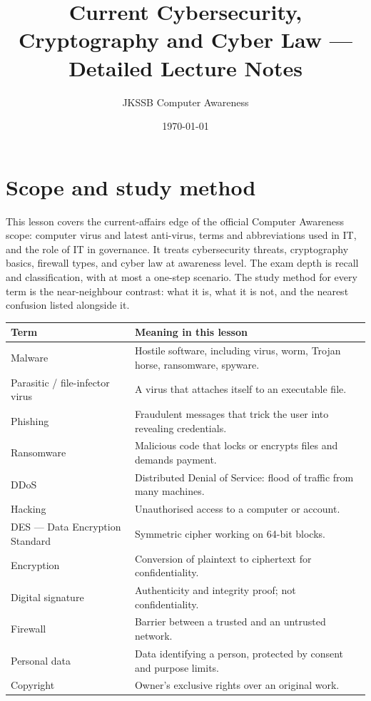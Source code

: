 \documentclass[11pt]{article}
\title{Current Cybersecurity, Cryptography and Cyber Law --- Detailed Lecture Notes}
\author{JKSSB Computer Awareness}
\date{\today}
\begin{document}
\maketitle

\section{Scope and study method}
This lesson covers the current-affairs edge of the official Computer Awareness
scope: computer virus and latest anti-virus, terms and abbreviations used in
IT, and the role of IT in governance. It treats cybersecurity threats,
cryptography basics, firewall types, and cyber law at awareness level. The
exam depth is recall and classification, with at most a one-step scenario.
The study method for every term is the near-neighbour contrast: what it is,
what it is not, and the nearest confusion listed alongside it.

\begin{center}
\begin{tabular}{p{}p{}}
\toprule
\textbf{Term} & \textbf{Meaning in this lesson} \\
\midrule
Malware & Hostile software, including virus, worm, Trojan horse, ransomware, spyware. \\
Parasitic / file-infector virus & A virus that attaches itself to an executable file. \\
Phishing & Fraudulent messages that trick the user into revealing credentials. \\
Ransomware & Malicious code that locks or encrypts files and demands payment. \\
DDoS & Distributed Denial of Service: flood of traffic from many machines. \\
Hacking & Unauthorised access to a computer or account. \\
DES --- Data Encryption Standard & Symmetric cipher working on 64-bit blocks. \\
Encryption & Conversion of plaintext to ciphertext for confidentiality. \\
Digital signature & Authenticity and integrity proof; not confidentiality. \\
Firewall & Barrier between a trusted and an untrusted network. \\
Personal data & Data identifying a person, protected by consent and purpose limits. \\
Copyright & Owner's exclusive rights over an original work. \\
\bottomrule
\end{tabular}
\end{center}
\end{document}
